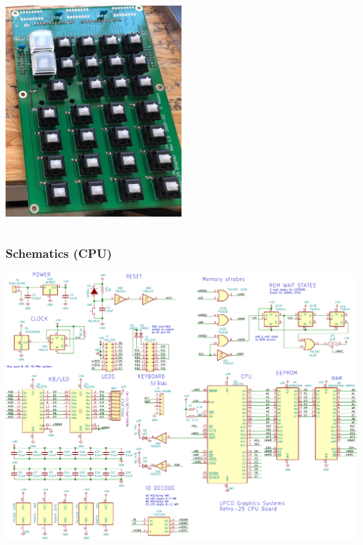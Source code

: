 \documentclass{beamer}
\begin{document}
\begin{frame}
\begin{columns}
    \includegraphics[width=0.5\textwidth]{figs/led-board-stuffed.jpg}

\end{columns}
\end{frame}

\begin{frame}
  \frametitle{Schematics (CPU)}

  \vskip -0.2in
  \includegraphics[width=\textwidth]{figs/cpu-sch-crop.pdf}

\end{frame}
\end{document}
